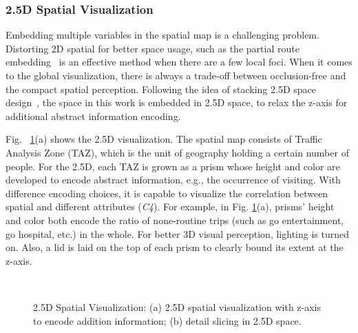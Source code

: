 \documentclass{ieeeaccess}
\begin{document}
\subsubsection{2.5D Spatial Visualization}
\label{subsec:25D}

Embedding multiple variables in the spatial map is a challenging problem. Distorting 2D spatial for better space usage, such as the partial route embedding~\cite{sun2016embedding} is an effective method when there are a few local foci. When it comes to the global visualization, there is always a trade-off between occlusion-free and the compact spatial perception. Following the idea of stacking 2.5D space design~\cite{Tominski2012_stacking}, the space in this work is embedded in 2.5D space, to relax the z-axis for additional abstract information encoding.

Fig. ~\ref{fig:2.5D}(a) shows the 2.5D visualization. The spatial map consists of Traffic Analysis Zone (TAZ), which is the unit of geography holding a certain number of people. For the 2.5D, each TAZ is grown as a prism whose height and color are developed to encode abstract information, e.g., the occurrence of visiting. With difference encoding choices, it is capable to visualize the correlation between spatial and different attributes (\textit{C4}). For example, in Fig. \ref{fig:2.5D}(a), prisms' height and color both encode the ratio of none-routine trips (such as go entertainment, go hospital, etc.) in the whole. For better 3D visual perception, lighting is turned on. Also, a lid is laid on the top of each prism to clearly bound its extent at the z-axis.

\begin{figure}
    \centering
    \label{1a}\hfill
    \label{1b}\\
\caption{2.5D Spatial Visualization: (a) 2.5D spatial visualization with z-axis to encode addition information; (b) detail slicing in 2.5D space.}
\label{fig:2.5D}
\end{figure}
\end{document}
